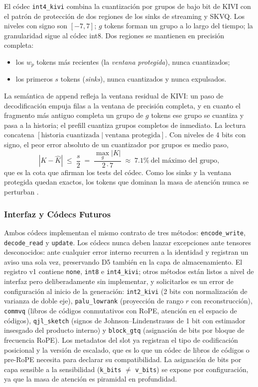 El códec \texttt{int4\_kivi} combina la cuantización por grupos de bajo bit de KIVI con el patrón de protección de dos regiones de los sinks de streaming y SKVQ. Los niveles con signo son $[-7,7]$; $g$ tokens forman un grupo a lo largo del tiempo; la granularidad sigue al códec int8. Dos regiones se mantienen en precisión completa:
\begin{itemize}[leftmargin=*]
    \item los $w_p$ tokens más recientes (la \emph{ventana protegida}), nunca cuantizados;
    \item los primeros $s$ tokens (\emph{sinks}), nunca cuantizados y nunca expulsados.
\end{itemize}
La semántica de append refleja la ventana residual de KIVI: un paso de decodificación empuja filas a la ventana de precisión completa, y en cuanto el fragmento más antiguo completa un grupo de $g$ tokens ese grupo se cuantiza y pasa a la historia; el prefill cuantiza grupos completos de inmediato. La lectura concatena $[\text{historia cuantizada}\mid\text{ventana protegida}]$. Con niveles de 4 bits con signo, el peor error absoluto de un cuantizador por grupos es medio paso,
\[
|K-\hat{K}| \;\le\; \frac{s}{2} \;=\; \frac{\max_{g}|K|}{2\cdot 7} \;\approx\; 7.1\%\ \text{del máximo del grupo},
\]
que es la cota que afirman los tests del códec. Como los sinks y la ventana protegida quedan exactos, los tokens que dominan la masa de atención nunca se perturban \citep{kivi_liu_2024,kvquant_hooper_2024,skvq_duanmu_2024,xiao_streaming_sinks_2024}.

\subsubsection{Interfaz y Códecs Futuros}

Ambos códecs implementan el mismo contrato de tres métodos: \texttt{encode\_write}, \texttt{decode\_read} y \texttt{update}. Los códecs nunca deben lanzar excepciones ante tensores desconocidos: ante cualquier error interno recurren a la identidad y registran un aviso una sola vez, preservando D5 también en la capa de almacenamiento. El registro v1 contiene \texttt{none}, \texttt{int8} e \texttt{int4\_kivi}; otros métodos están listos a nivel de interfaz pero deliberadamente sin implementar, y solicitarlos es un error de configuración al inicio de la generación: \texttt{int2\_kivi} (2 bits con normalización de varianza de doble eje), \texttt{palu\_lowrank} (proyección de rango $r$ con reconstrucción), \texttt{commvq} (libros de códigos conmutativos con RoPE, atención en el espacio de códigos), \texttt{qjl\_sketch} (signos de Johnson--Lindenstrauss de 1 bit con estimador insesgado del producto interno) y \texttt{block\_gtq} (asignación de bits por bloque de frecuencia RoPE). Los metadatos del slot ya registran el tipo de codificación posicional y la versión de escalado, que es lo que un códec de libros de códigos o pre-RoPE necesita para declarar su compatibilidad. La asignación de bits por capa sensible a la sensibilidad (\texttt{k\_bits} $\ne$ \texttt{v\_bits}) se expone por configuración, ya que la masa de atención es piramidal en profundidad.

